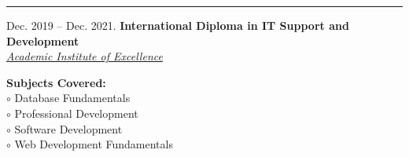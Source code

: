 \documentclass[10pt,a4paper,ragged2e,withhyper]{altacv}
\newcommand{\MyVerticalRule}{
		\textcolor{ColorOne}
		{
		  \rule
		  	{1pt}
		  	{\textheight}
		}
	}
\newcommand{\MySkip} {
		\vskip 
		12pt
	}
\newcommand{\myhref}[2]{
		\href{#1}
		{\textcolor{ColorTwo}{#2}}
	}
\begin{document}
    \begin{adjustbox}{valign=t}
        \begin{minipage}{0.05\textwidth} %
        \MyVerticalRule  
        \end{minipage}
    \end{adjustbox} 
    \begin{adjustbox}{valign=t}
        \begin{minipage}{0.6\textwidth}
            
            \MySkip
            
             \vspace{-8mm} \normalfont \textcolor{ColorOne}{Dec. 2019 -- Dec. 2021.}
                    \newline \textbf{International Diploma in IT Support and Development}\\ \medskip 
                    	\textit{\myhref{https://aie.ac/tcp-2_30_499-full-stack-web-and-software-developer-nc-it-systems-developer-nqf5.html}{Academic Institute of Excellence}     }\\ 
                    	\begin{small}
                           \textbf{Subjects Covered:}\\
									\textcolor{ColorOne}{$\circ$} Database Fundamentals\\
									\textcolor{ColorOne}{$\circ$} Professional Development\\
									\textcolor{ColorOne}{$\circ$} Software Development\\
									\textcolor{ColorOne}{$\circ$} Web Development Fundamentals\\
									

\end{small}
\end{minipage}
\end{adjustbox}
\end{document}
